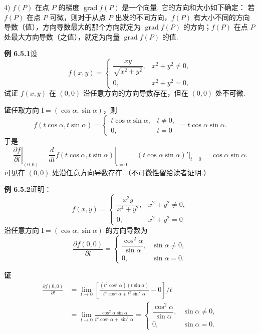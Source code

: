 \documentclass[UTF8, 12pt, fontset=fandol, oneside]{ctexart}
\begin{document}
4) $f(P)$ 在点 $P$ 的梯度 $\operatorname{grad}f(P)$ 是一个向量. 它的方向和大小如下确定：
若 $f(P)$ 在点 $P$ 可微，则对于从点 $P$ 出发的不同方向，$f(P)$ 有大小不同的方向导数（值），方向导数最大的那个方向就定为 $\operatorname{grad}f(P)$ 的方向；$f(P)$ 在点 $P$ 处最大方向导数（之值），就定为向量 $\operatorname{grad}f(P)$ 的值.

\noindent\textbf{例 6.5.1}\quad 设
\[
f(x,y)=
\begin{cases}
  \dfrac{xy}{\sqrt{x^2+y^2}},&x^2+y^2\ne0,\\[6pt]
  0,&x^2+y^2=0,
\end{cases}
\]
试证 $f(x,y)$ 在 $(0,0)$ 沿任意方向的方向导数存在，但在 $(0,0)$ 处不可微.

\noindent\textbf{证}\quad 任取方向 $\mathbf l=(\cos\alpha,\sin\alpha)$，则
\[
f(t\cos\alpha,t\sin\alpha)
=
\begin{cases}
  t\cos\alpha\sin\alpha,&t\ne0,\\
  0,&t=0
\end{cases}
=t\cos\alpha\sin\alpha.
\]
于是
\[
\left.\frac{\partial f}{\partial l}\right|_{(0,0)}
=
\left.\frac d{dt}f(t\cos\alpha,t\sin\alpha)\right|_{t=0}
=(t\cos\alpha\sin\alpha)'|_{t=0}
=\cos\alpha\sin\alpha.
\]
可见在 $(0,0)$ 处沿任意方向导数存在.（不可微性留给读者证明.）

\noindent\textbf{例 6.5.2}\quad 证明：
\[
f(x,y)=
\begin{cases}
  \dfrac{x^2y}{x^4+y^2},&x^2+y^2\ne0,\\[6pt]
  0,&x^2+y^2=0
\end{cases}
\]
沿任意方向 $\mathbf l=(\cos\alpha,\sin\alpha)$ 的方向导数为
\[
\frac{\partial f(0,0)}{\partial l}
=
\begin{cases}
  \dfrac{\cos^2\alpha}{\sin\alpha},&\sin\alpha\ne0,\\[6pt]
  0,&\sin\alpha=0.
\end{cases}
\]

\noindent\textbf{证}\quad
\[
\begin{aligned}
\frac{\partial f(0,0)}{\partial l}
&=\lim_{t\to0}
\left[
\frac{(t^2\cos^2\alpha)(t\sin\alpha)}
     {t^4\cos^4\alpha+t^2\sin^2\alpha}
-0
\right]\bigg/t\\
&=\lim_{t\to0}\frac{\cos^2\alpha\sin\alpha}{t^2\cos^4\alpha+\sin^2\alpha}
=
\begin{cases}
  \dfrac{\cos^2\alpha}{\sin\alpha},&\sin\alpha\ne0,\\[6pt]
  0,&\sin\alpha=0.
\end{cases}
\end{aligned}
\]
\end{document}
